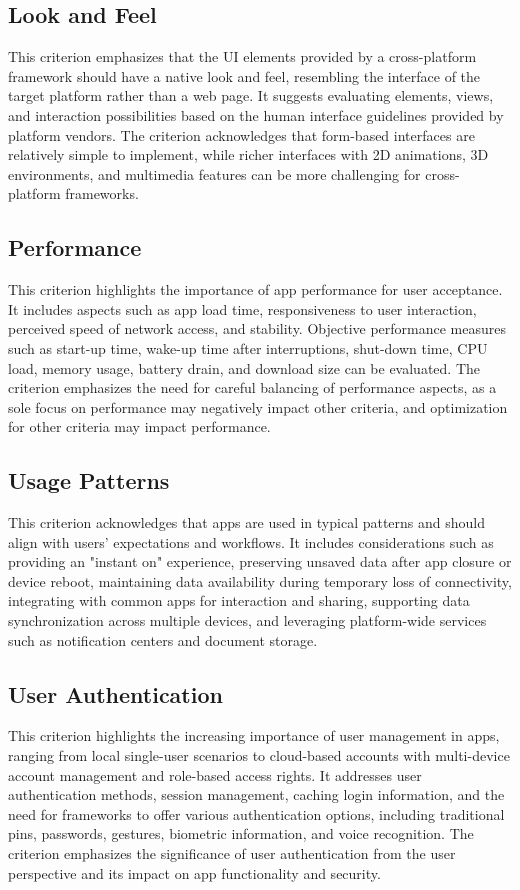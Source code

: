 \subsection{Look and Feel}
This criterion emphasizes that the UI elements provided by a cross-platform framework should have a native look and feel, resembling the interface of the target platform rather than a web page. It suggests evaluating elements, views, and interaction possibilities based on the human interface guidelines provided by platform vendors. The criterion acknowledges that form-based interfaces are relatively simple to implement, while richer interfaces with 2D animations, 3D environments, and multimedia features can be more challenging for cross-platform frameworks.

\subsection{Performance}
This criterion highlights the importance of app performance for user acceptance. It includes aspects such as app load time, responsiveness to user interaction, perceived speed of network access, and stability. Objective performance measures such as start-up time, wake-up time after interruptions, shut-down time, CPU load, memory usage, battery drain, and download size can be evaluated. The criterion emphasizes the need for careful balancing of performance aspects, as a sole focus on performance may negatively impact other criteria, and optimization for other criteria may impact performance.

\subsection{Usage Patterns}
This criterion acknowledges that apps are used in typical patterns and should align with users' expectations and workflows. It includes considerations such as providing an "instant on" experience, preserving unsaved data after app closure or device reboot, maintaining data availability during temporary loss of connectivity, integrating with common apps for interaction and sharing, supporting data synchronization across multiple devices, and leveraging platform-wide services such as notification centers and document storage.

\subsection{User Authentication}
This criterion highlights the increasing importance of user management in apps, ranging from local single-user scenarios to cloud-based accounts with multi-device account management and role-based access rights. It addresses user authentication methods, session management, caching login information, and the need for frameworks to offer various authentication options, including traditional pins, passwords, gestures, biometric information, and voice recognition. The criterion emphasizes the significance of user authentication from the user perspective and its impact on app functionality and security.

